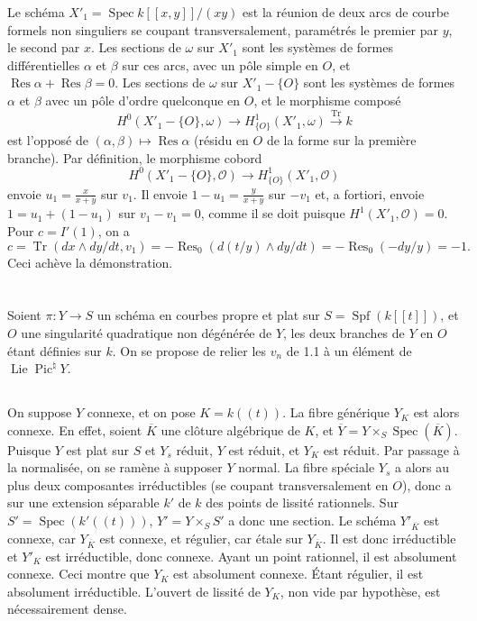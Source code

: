 \documentclass[12pt,a4paper]{article}
\theoremstyle{plain}
\theoremstyle{definition}
\theoremstyle{remark}
\DeclareMathOperator{\Spf}{Spf}
\DeclareMathOperator{\Spec}{Spec}
\DeclareMathOperator{\Lie}{Lie}
\DeclareMathOperator{\Pic}{Pic}
\DeclareMathOperator{\Res}{Res}
\DeclareMathOperator{\Tr}{Tr}
\newcommand{\OO}{\mathcal{O}}
\providecommand{\Spec}{\operatorname{Spec}}
\providecommand{\Lie}{\operatorname{Lie}}
\providecommand{\Tr}{\operatorname{Tr}}
\begin{document}
Le schéma $X'_1=\Spec k[[x,y]]/(xy)$ est la réunion de deux arcs de courbe
formels non singuliers se coupant transversalement, paramétrés le premier par
$y$, le second par $x$. Les sections de $\omega$ sur $X'_1$ sont les systèmes de formes
différentielles $\alpha$ et $\beta$ sur ces arcs, avec un pôle simple en $O$, et
$\Res\alpha+\Res\beta=0$. Les sections de $\omega$ sur $X'_1-\{O\}$ sont les systèmes de
formes $\alpha$ et $\beta$ avec un pôle d'ordre quelconque en $O$, et le morphisme composé
\[
H^0(X'_1-\{O\},\omega)\to H^1_{\{O\}}(X'_1,\omega)\xrightarrow{\Tr} k
\]
est l'opposé de $(\alpha,\beta)\mapsto\Res\alpha$ (résidu en $O$ de la forme sur la première
branche). Par définition, le morphisme cobord
\[
H^0(X'_1-\{O\},\OO)\to H^1_{\{O\}}(X'_1,\OO)
\]
envoie $u_1=\frac{x}{x+y}$ sur $v_1$. Il envoie $1-u_1=\frac{y}{x+y}$ sur $-v_1$ et, a fortiori,
envoie $1=u_1+(1-u_1)$ sur $v_1-v_1=0$, comme il se doit puisque $H^1(X'_1,\OO)=0$.
Pour $c=I'(1)$, on a
\[
c=\Tr(dx\wedge dy/dt, v_1)=-\Res_0(d(t/y)\wedge dy/dt)=-\Res_0(-dy/y)=-1.
\]
Ceci achève la démonstration.

\section{}

\subsection{}

Soient $\pi:Y\to S$ un schéma en courbes propre et plat sur $S=\Spf(k[[t]])$,
et $O$ une singularité quadratique non dégénérée de $Y$, les deux branches de $Y$ en
$O$ étant définies sur $k$. On se propose de relier les $v_n$ de 1.1 à un élément de
$\Lie\Pic^\natural Y$.

\subsection{}

On suppose $Y$ connexe, et on pose $K=k((t))$. La fibre générique $Y_K$ est alors
connexe. En effet, soient $\overline{K}$ une clôture algébrique de $K$, et
$\overline{Y}=Y\times_S\Spec(\overline{K})$. Puisque $Y$ est plat sur $S$ et $Y_s$ réduit,
$Y$ est réduit, et $Y_K$ est réduit. Par passage à la normalisée, on se ramène à supposer
$Y$ normal. La fibre spéciale $Y_s$ a alors au plus deux composantes irréductibles
(se coupant transversalement en $O$), donc a sur une extension séparable $k'$ de $k$ des
points de lissité rationnels. Sur $S'=\Spec(k'((t)))$, $Y'=Y\times_S S'$ a donc une section.
Le schéma $Y'_{\overline{K}}$ est connexe, car $Y_{\overline{K}}$ est connexe, et régulier, car étale sur
$Y_{\overline{K}}$. Il est donc irréductible et $Y'_K$ est irréductible, donc connexe. Ayant un
point rationnel, il est absolument connexe. Ceci montre que $Y_K$ est absolument connexe.
Étant régulier, il est absolument irréductible. L'ouvert de lissité de $Y_K$, non vide par
hypothèse, est nécessairement dense.
\end{document}

